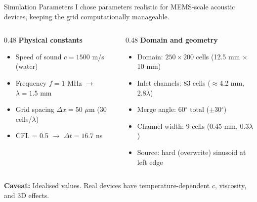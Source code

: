 \documentclass[aspectratio=169,11pt]{beamer}
\begin{document}
\begin{frame}{Simulation Parameters}
  I chose parameters realistic for MEMS-scale acoustic devices, keeping the grid computationally manageable.

  \begin{columns}[T]
    \begin{column}{0.48\textwidth}
      \footnotesize
      \textbf{Physical constants}
      \begin{itemize}
        \item Speed of sound $c = 1500$ m/s (water)
        \item Frequency $f = 1$ MHz $\rightarrow$ $\lambda = 1.5$ mm
        \item Grid spacing $\Delta x = 50$ $\mu$m (30 cells/$\lambda$)
        \item CFL = 0.5 $\rightarrow$ $\Delta t = 16.7$ ns
      \end{itemize}
    \end{column}
    \begin{column}{0.48\textwidth}
      \footnotesize
      \textbf{Domain and geometry}
      \begin{itemize}
        \item Domain: $250 \times 200$ cells (12.5 mm $\times$ 10 mm)
        \item Inlet channels: 83 cells ($\approx$4.2 mm, 2.8$\lambda$)
        \item Merge angle: 60$^\circ$ total ($\pm$30$^\circ$)
        \item Channel width: 9 cells (0.45 mm, 0.3$\lambda$)
        \item Source: hard (overwrite) sinusoid at left edge
      \end{itemize}
    \end{column}
  \end{columns}

  \vspace{0.1cm}
  \textcolor{gdpBurgundy}{\small \textbf{Caveat:} Idealised values. Real devices have temperature-dependent $c$, viscosity, and 3D effects.}
\end{frame}
\end{document}
